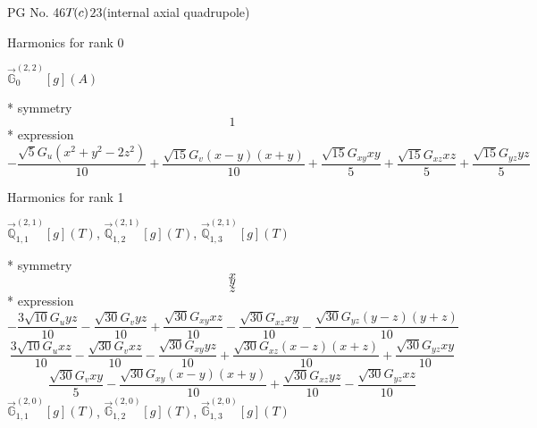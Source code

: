 \documentclass[fleqn,8pt]{jsarticle}
\begin{document}
\setcounter{MaxMatrixCols}{32}

\renewcommand{\tablename}{Table~}
\renewcommand{\figurename}{Figure~}
\begin{center}
\LARGE
PG No. 46\quad$T_{\rm }(c)$\quad$23$\quad[ cubic ] (internal axial quadrupole)
\end{center}

\noindent * Harmonics for rank 0

\noindent\quad $\vec{\mathbb{G}}_{0}^{(2,2)}[g](A)$

\noindent\quad ** symmetry
\begin{dmath*}
1
\end{dmath*}
\noindent\quad ** expression
\begin{dmath*}
- \frac{\sqrt{5} G_{u} \left(x^{2} + y^{2} - 2 z^{2}\right)}{10} + \frac{\sqrt{15} G_{v} \left(x - y\right) \left(x + y\right)}{10} + \frac{\sqrt{15} G_{xy} x y}{5} + \frac{\sqrt{15} G_{xz} x z}{5} + \frac{\sqrt{15} G_{yz} y z}{5}
\end{dmath*}

\noindent * Harmonics for rank 1

\noindent\quad $\vec{\mathbb{Q}}_{1,1}^{(2,1)}[g](T)$, $\vec{\mathbb{Q}}_{1,2}^{(2,1)}[g](T)$, $\vec{\mathbb{Q}}_{1,3}^{(2,1)}[g](T)$

\noindent\quad ** symmetry
\begin{dmath*}
x
\end{dmath*}
\begin{dmath*}
y
\end{dmath*}
\begin{dmath*}
z
\end{dmath*}
\noindent\quad ** expression
\begin{dmath*}
- \frac{3 \sqrt{10} G_{u} y z}{10} - \frac{\sqrt{30} G_{v} y z}{10} + \frac{\sqrt{30} G_{xy} x z}{10} - \frac{\sqrt{30} G_{xz} x y}{10} - \frac{\sqrt{30} G_{yz} \left(y - z\right) \left(y + z\right)}{10}
\end{dmath*}
\begin{dmath*}
\frac{3 \sqrt{10} G_{u} x z}{10} - \frac{\sqrt{30} G_{v} x z}{10} - \frac{\sqrt{30} G_{xy} y z}{10} + \frac{\sqrt{30} G_{xz} \left(x - z\right) \left(x + z\right)}{10} + \frac{\sqrt{30} G_{yz} x y}{10}
\end{dmath*}
\begin{dmath*}
\frac{\sqrt{30} G_{v} x y}{5} - \frac{\sqrt{30} G_{xy} \left(x - y\right) \left(x + y\right)}{10} + \frac{\sqrt{30} G_{xz} y z}{10} - \frac{\sqrt{30} G_{yz} x z}{10}
\end{dmath*}
\noindent\quad $\vec{\mathbb{G}}_{1,1}^{(2,0)}[g](T)$, $\vec{\mathbb{G}}_{1,2}^{(2,0)}[g](T)$, $\vec{\mathbb{G}}_{1,3}^{(2,0)}[g](T)$
\end{document}
